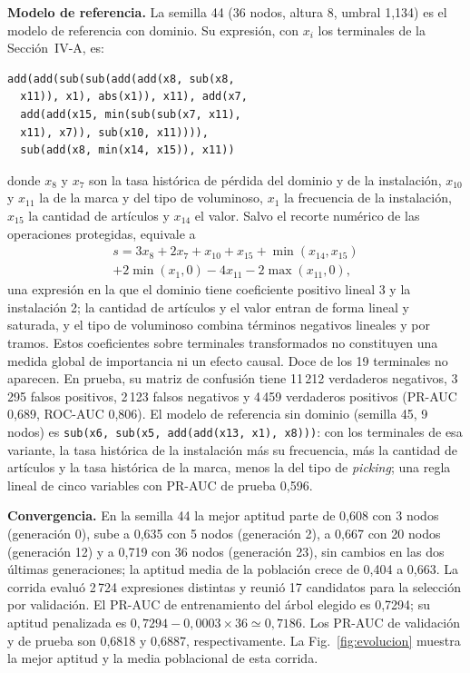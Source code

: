 \documentclass[conference]{IEEEtran}
\begin{document}
\textbf{Modelo de referencia.} La semilla 44 (36 nodos, altura 8, umbral
1,134) es el modelo de referencia con dominio. Su expresión, con $x_i$ los
terminales de la Sección~IV-A, es:
\begin{verbatim}
add(add(sub(sub(add(add(x8, sub(x8,
  x11)), x1), abs(x1)), x11), add(x7,
  add(add(x15, min(sub(sub(x7, x11),
  x11), x7)), sub(x10, x11)))),
  sub(add(x8, min(x14, x15)), x11))
\end{verbatim}
donde $x_8$ y $x_7$ son la tasa histórica de pérdida del dominio y de la
instalación, $x_{10}$ y $x_{11}$ la de la marca y del tipo de voluminoso,
$x_1$ la frecuencia de la instalación, $x_{15}$ la cantidad de artículos y
$x_{14}$ el valor. Salvo el recorte numérico de las operaciones protegidas,
equivale a
\begin{multline}
s = 3x_8 + 2x_7 + x_{10} + x_{15} + \min(x_{14}, x_{15}) \\
+ 2\min(x_1, 0) - 4x_{11} - 2\max(x_{11}, 0),
\end{multline}
una expresión en la que el dominio tiene coeficiente positivo lineal 3 y la
instalación 2; la cantidad de artículos y el valor entran de forma lineal y
saturada, y el tipo de voluminoso combina términos negativos lineales y
por tramos. Estos coeficientes sobre terminales transformados no constituyen
una medida global de importancia ni un efecto causal. Doce de los 19
terminales no aparecen. En prueba, su matriz de confusión tiene 11\,212
verdaderos negativos, 3\,295 falsos positivos, 2\,123 falsos negativos y
4\,459 verdaderos positivos (PR-AUC 0,689, ROC-AUC 0,806). El modelo de
referencia sin dominio (semilla 45, 9 nodos) es
\texttt{sub(x6, sub(x5, add(add(x13, x1), x8)))}: con los terminales de esa
variante, la tasa histórica de la instalación más su frecuencia, más la
cantidad de artículos y la tasa histórica de la marca, menos la del tipo de
\textit{picking}; una regla lineal de cinco variables con PR-AUC de prueba
0,596.

\textbf{Convergencia.} En la semilla 44 la mejor aptitud parte de 0,608 con
3 nodos (generación 0), sube a 0,635 con 5 nodos (generación 2), a 0,667 con
20 nodos (generación 12) y a 0,719 con 36 nodos (generación 23), sin cambios
en las dos últimas generaciones; la aptitud media de la población crece de
0,404 a 0,663. La corrida evaluó 2\,724 expresiones distintas y reunió 17
candidatos para la selección por validación. El PR-AUC de entrenamiento del
árbol elegido es 0,7294; su aptitud penalizada es
$0{,}7294-0{,}0003\times36\simeq0{,}7186$. Los PR-AUC de validación y de
prueba son 0,6818 y 0,6887, respectivamente. La Fig.~\ref{fig:evolucion}
muestra la mejor aptitud y la media poblacional de esta corrida.
\end{document}
